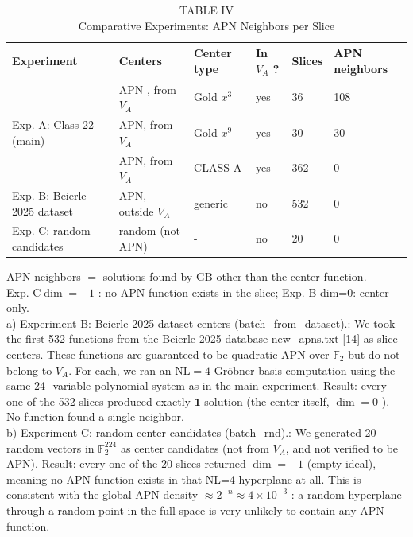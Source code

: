 \documentclass[10pt]{article}
\begin{document}
\begin{table}[h]
\begin{center}
\captionsetup{labelformat=empty}
\caption{TABLE IV\\
Comparative Experiments: APN Neighbors per Slice}
\begin{tabular}{|l|l|l|l|l|l|}
\hline
Experiment & Centers & Center type & In $V_{A}$ ? & Slices & APN neighbors \\
\hline
\multirow[t]{3}{*}{Exp. A: Class-22 (main)} & APN , from $V_{A}$ & Gold $x^{3}$ & yes & 36 & 108 \\
\hline
 & APN, from $V_{A}$ & Gold $x^{9}$ & yes & 30 & 30 \\
\hline
 & APN, from $V_{A}$ & CLASS-A & yes & 362 & 0 \\
\hline
Exp. B: Beierle 2025 dataset & APN, outside $V_{A}$ & generic & no & 532 & 0 \\
\hline
Exp. C: random candidates & random (not APN) & - & no & 20 & 0 \\
\hline
\end{tabular}
\end{center}
\end{table}

APN neighbors $=$ solutions found by GB other than the center function.\\
Exp. $\mathrm{C} \operatorname{dim}=-1$ : no APN function exists in the slice; Exp. B dim=0: center only.\\[0pt]
a) Experiment B: Beierle 2025 dataset centers (batch\_from\_dataset).: We took the first 532 functions from the Beierle 2025 database new\_apns.txt [14] as slice centers. These functions are guaranteed to be quadratic APN over $\mathbb{F}_{2}$ but do not belong to $V_{A}$. For each, we ran an $\mathrm{NL}=4$ Gröbner basis computation using the same 24 -variable polynomial system as in the main experiment. Result: every one of the 532 slices produced exactly $\mathbf{1}$ solution (the center itself, $\operatorname{dim}=0$ ). No function found a single neighbor.\\
b) Experiment C: random center candidates (batch\_rnd).: We generated 20 random vectors in $\mathbb{F}_{2}^{224}$ as center candidates (not from $V_{A}$, and not verified to be APN). Result: every one of the 20 slices returned $\operatorname{dim}=-1$ (empty ideal), meaning no APN function exists in that NL=4 hyperplane at all. This is consistent with the global APN density $\approx 2^{-n} \approx 4 \times 10^{-3}$ : a random hyperplane through a random point in the full space is very unlikely to contain any APN function.
\end{document}
